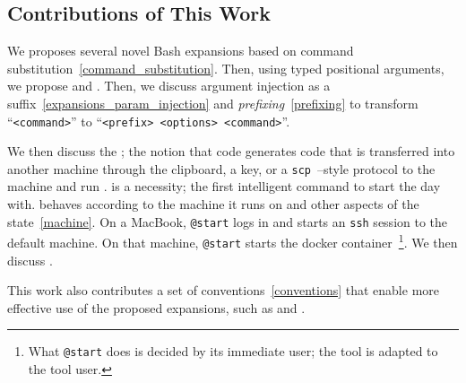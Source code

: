 \subsection{Contributions of This Work}\label{contributions}

We proposes several novel Bash expansions based on command substitution~\ref{command_substitution}. Then, using typed positional arguments, we propose  and . Then, we discuss argument injection as a suffix~\ref{expansions_param_injection} and \emph{prefixing}~\ref{prefixing} to transform ``\texttt{<command>}'' to ``\texttt{<prefix> <options> <command>}''.

We then discuss the \kSeed; the notion that code generates code that is transferred into another machine through the clipboard, a key, or a \texttt{scp}~\cite{scp}--style protocol to  the machine and run . \kStart is a necessity; the first intelligent command to start the day with. \kStart behaves according to the machine it runs on and other aspects of the state~\ref{machine}. On a MacBook, \texttt{@start} logs in and starts an \texttt{ssh} session to the default machine. On that machine, \texttt{@start} starts the docker container~\footnote{What \texttt{@start} does is decided by its immediate user; the tool is adapted to the tool user.}. We then discuss \kGit.

This work also contributes a set of conventions~\ref{conventions} that enable more effective use of the proposed expansions, such as  and .